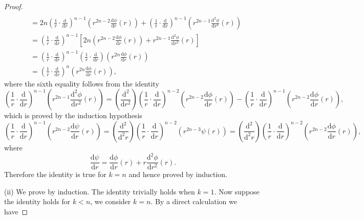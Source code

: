 \begin{proof}
$$\begin{aligned}
\\
&=2n\left( \frac{1}{r}\cdot \frac{\mathrm{d}}{\mathrm{d}r} \right) ^{n-1}\left( r^{2n-2}\frac{\mathrm{d}\phi}{\mathrm{d}r}\left( r \right) \right) +\left( \frac{1}{r}\cdot \frac{\mathrm{d}}{\mathrm{d}r} \right) ^{n-1}\left( r^{2n-1}\frac{\mathrm{d}^2\phi}{\mathrm{d}r^2}\left( r \right) \right) 
\\
&=\left( \frac{1}{r}\cdot \frac{\mathrm{d}}{\mathrm{d}r} \right) ^{n-1}\left[ 2n\left( r^{2n-2}\frac{\mathrm{d}\phi}{\mathrm{d}r}\left( r \right) \right) +r^{2n-1}\frac{\mathrm{d}^2\phi}{\mathrm{d}r^2}\left( r \right) \right] 
\\
&=\left( \frac{1}{r}\cdot \frac{\mathrm{d}}{\mathrm{d}r} \right) ^{n-1}\left( \frac{1}{r}\cdot \frac{\mathrm{d}}{\mathrm{d}r} \right) \left( r^{2n}\frac{\mathrm{d}\phi}{\mathrm{d}r}\left( r \right) \right) 
\\
&=\left( \frac{1}{r}\cdot \frac{\mathrm{d}}{\mathrm{d}r} \right) ^n\left( r^{2n}\frac{\mathrm{d}\phi}{\mathrm{d}r}\left( r \right) \right) ,
\end{aligned}
$$
where the sixth equality follows from the identity 
$$
\left( \frac{1}{r}\cdot \frac{\mathrm{d}}{\mathrm{d}r} \right) ^{n-1}\left( r^{2n-1}\frac{\mathrm{d}^2\phi}{\mathrm{d}r^2}\left( r \right) \right) =\left( \frac{\mathrm{d}^2}{\mathrm{d}r^2} \right) \left( \frac{1}{r}\cdot \frac{\mathrm{d}}{\mathrm{d}r} \right) ^{n-2}\left( r^{2n-2}\frac{\mathrm{d}\phi}{\mathrm{d}r}\left( r \right) \right) -\left( \frac{1}{r}\cdot \frac{\mathrm{d}}{\mathrm{d}r} \right) ^{n-1}\left( r^{2n-2}\frac{\mathrm{d}\phi}{\mathrm{d}r}\left( r \right) \right) ,
$$
which is proved by the induction hypothesis 
$$
\left( \frac{1}{r}\cdot \frac{\mathrm{d}}{\mathrm{d}r} \right) ^{n-1}\left( r^{2n-2}\frac{\mathrm{d}\psi}{\mathrm{d}r}\left( r \right) \right) =\left( \frac{\mathrm{d}^2}{\mathrm{d}^2r} \right) \left( \frac{1}{r}\cdot \frac{\mathrm{d}}{\mathrm{d}r} \right) ^{n-2}\left( r^{2n-3}\psi \left( r \right) \right) =\left( \frac{\mathrm{d}^2}{\mathrm{d}^2r} \right) \left( \frac{1}{r}\cdot \frac{\mathrm{d}}{\mathrm{d}r} \right) ^{n-2}\left( r^{2n-2}\frac{\mathrm{d}\phi}{\mathrm{d}r}\left( r \right) \right) ,
$$
where 
$$
\frac{\mathrm{d}\psi}{\mathrm{d}r}=\frac{\mathrm{d}\phi}{\mathrm{d}r}\left( r \right) +r\frac{\mathrm{d}^2\phi}{\mathrm{d}r^2}\left( r \right) .
$$
Therefore the identity is true for $k=n$ and hence proved by induction.\par
(ii) We prove by induction. The identity trivially holds when $k=1$. Now suppose the identity holds for $k<n$, we consider $k=n$. By a direct calculation we have 

\end{proof}
